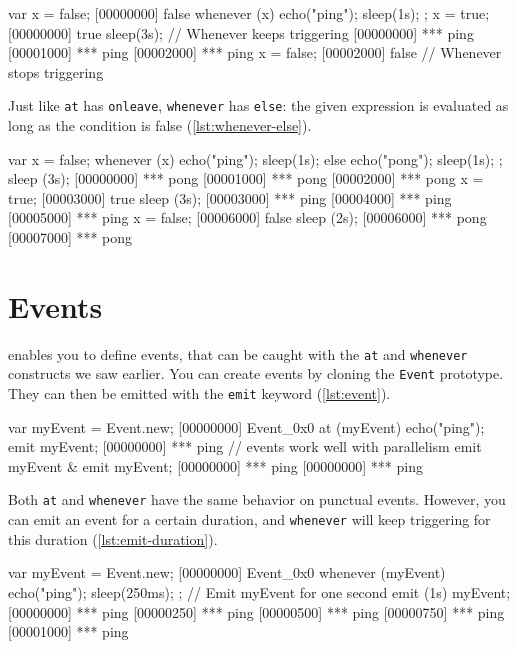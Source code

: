 \documentclass[openright,twoside,12pt]{report}
\begin{document}
\begin{urbiscript}[caption=Using \texttt{whenever}, label=lst:whenever]
var x = false;
[00000000] false
whenever (x)
{
  echo("ping");
  sleep(1s);
};
x = true;
[00000000] true
sleep(3s);
// Whenever keeps triggering
[00000000] *** ping
[00001000] *** ping
[00002000] *** ping
x = false;
[00002000] false
// Whenever stops triggering
\end{urbiscript}

Just like \lstinline|at| has \lstinline|onleave|, \lstinline|whenever|
has \lstinline|else|: the given expression is evaluated as long as the
condition is false (\autoref{lst:whenever-else}).

\begin{urbiscript}[caption=Using \texttt{whenever ... else},
label=lst:whenever-else]
var x = false;
whenever (x)
{
  echo("ping");
  sleep(1s);
}
else
{
  echo("pong");
  sleep(1s);
};
sleep (3s);
[00000000] *** pong
[00001000] *** pong
[00002000] *** pong
x = true;
[00003000] true
sleep (3s);
[00003000] *** ping
[00004000] *** ping
[00005000] *** ping
x = false;
[00006000] false
sleep (2s);
[00006000] *** pong
[00007000] *** pong
\end{urbiscript}

\section{Events}

\urbi enables you to define events, that can be caught with the
\lstinline|at| and \lstinline|whenever| constructs we saw earlier. You
can create events by cloning the \lstinline|Event| prototype. They can
then be emitted with the \lstinline|emit| keyword (\autoref{lst:event}).

\begin{urbiscript}[caption=Using events, label=lst:event]
var myEvent = Event.new;
[00000000] Event_0x0
at (myEvent)
  echo("ping");
emit myEvent;
[00000000] *** ping
// events work well with parallelism
emit myEvent & emit myEvent;
[00000000] *** ping
[00000000] *** ping
\end{urbiscript}

Both \lstinline|at| and \lstinline|whenever| have the same behavior on
punctual events. However, you can emit an event for a certain
duration, and \lstinline|whenever| will keep triggering for this
duration (\autoref{lst:emit-duration}).

\begin{urbiscript}[caption=Emitting events with a duration,
label=lst:emit-duration]
var myEvent = Event.new;
[00000000] Event_0x0
whenever (myEvent)
{
  echo("ping");
  sleep(250ms);
};
// Emit myEvent for one second
emit (1s) myEvent;
[00000000] *** ping
[00000250] *** ping
[00000500] *** ping
[00000750] *** ping
[00001000] *** ping
\end{urbiscript}
\end{document}
